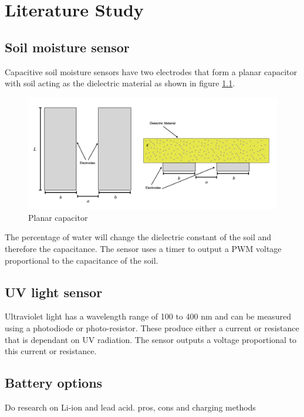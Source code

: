 \graphicspath{{literature_study/fig/}}

\chapter{Literature Study}
\label{chap:literature_study}

\section{Soil moisture sensor}
Capacitive soil moisture sensors have two electrodes that form a planar capacitor with soil acting as the dielectric material as shown in figure \ref{fig:capacitor}. 

\begin{figure}[!h]
    \centering
    \includegraphics[width= 0.9\linewidth]{coplanar_capacitor_drawing.png}
    \caption{Planar capacitor \cite{moisture_sensor_img}}
    \label{fig:capacitor}
\end{figure}

The percentage of water will change the dielectric constant of the soil and therefore the capacitance. The sensor uses a timer to output a PWM voltage proportional to the capacitance of the soil. \cite{moisture_sensor_img}

\section{UV light sensor}
Ultraviolet light has a wavelength range of 100 to 400 nm and can be measured using a photodiode or photo-resistor. These produce either a current or resistance that is dependant on UV radiation. The sensor outputs a voltage proportional to this current or resistance. \cite{UV_sensor}

\section{Battery options}
Do research on Li-ion and lead acid. pros, cons and charging methods

